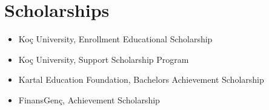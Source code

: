 \documentclass[letterpaper,11pt]{article}
\newcommand{\resumeItem}[1]{\item\small{{
    {#1 \vspace{-2pt}}
  }}}
\newcommand{\resumeItemListStart}{\begin{itemize}[parsep=0pt]}
\newcommand{\resumeItemListEnd}{\end{itemize}\vspace{-27pt}}
\begin{document}
\section{Scholarships}
\resumeItemListStart
    \resumeItem{Koç University, Enrollment Educational Scholarship}
    \resumeItem{Koç University, Support Scholarship Program}
    \resumeItem{Kartal Education Foundation, Bachelors Achievement Scholarship}
    \resumeItem{FinansGenç, Achievement Scholarship}
\resumeItemListEnd

\end{document}
